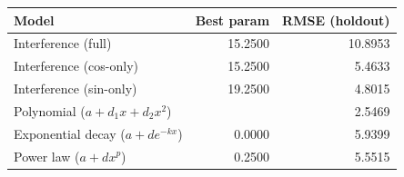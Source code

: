 \begin{tabular}{lrr}
\toprule
Model & Best param & RMSE (holdout) \\
\midrule
Interference (full) & 15.2500 & 10.8953 \\
Interference (cos-only) & 15.2500 & 5.4633 \\
Interference (sin-only) & 19.2500 & 4.8015 \\
Polynomial ($a + d_1 x + d_2 x^2$) &  & 2.5469 \\
Exponential decay ($a + d e^{-k x}$) & 0.0000 & 5.9399 \\
Power law ($a + d x^p$) & 0.2500 & 5.5515 \\
\bottomrule
\end{tabular}
